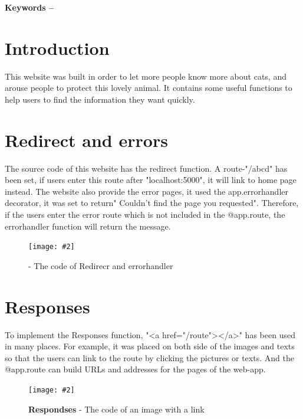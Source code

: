 \documentclass[10pt, a4paper]{article}
\title{\mytitle}
\author{\myauthor\hspace{1em}\\\contact\\Edinburgh Napier University\hspace{0.5em}-\hspace{0.5em}\mymodule}
\date{}
\newcommand{\figuremacro}[5]{
    \begin{figure}[#1]
        \centering
        \texttt{[image: \#2]}
        \caption[#3]{\textbf{#3}#4}
        \label{fig:#2}
    \end{figure}
}
\begin{document}
	\maketitle
	\begin{abstract}
	   In the recent years,more and more families are willing to keep pets at homes. And the pets play an important role in the families gradually. This web-app is for people who like cats and want to know more about them. The web-app includes several sections below: the different breeds of cats, meanings of their actions, and also their history.
		
	\end{abstract}
    
	\textbf{Keywords -- }{\mykeywords}

	\section{Introduction}
	 This website was built in order to let more people know more about cats, and arouse people to protect this lovely animal. It contains some useful functions to help users to find the information they want quickly.
	
	\section{Redirect and errors}
    The source code of this website has the redirect function. A route-"/abcd" has been set, if users enter this route after "localhost:5000", it will link to home page instead. The website also provide the error pages, it used the app.errorhandler decorator, it was set to return" Couldn't find the page you requested". Therefore, if the users enter the error route which is not included in the @app.route, the errorhandler function  will return the message.
    
    \figuremacro{h}{re.JPG}{}{ - The code of Redirecr and errorhandler}{1.0}
    
    \section{Responses}
    To implement the Responses function, "<a href="/route"></a>" has been used in many places. For example, it was placed on both side of the images and texts so that the users can link to the route by clicking the pictures or texts. And the @app.route can build URLs and addresses for the pages of the web-app. 
    
    \figuremacro{h}{rrag.JPG}{Respondses}{ - The code of an image with a link}{1.0}
    
\end{document}
